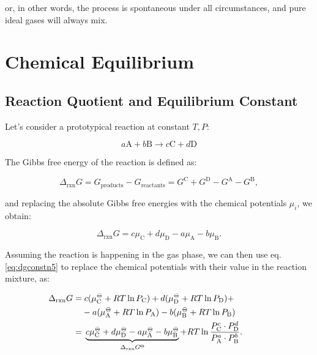 \documentclass[
]{book}
\theoremstyle{definition}
\theoremstyle{definition}
\theoremstyle{definition}
\theoremstyle{remark}
\begin{document}
or, in other words, the process is spontaneous under all circumstances, and pure ideal gases will always mix.

\renewcommand*{\standardstate}{{-\kern-6pt{\ominus}\kern-6pt-}}

\hypertarget{ChemicalEquilibrium}{%
\chapter{Chemical Equilibrium}\label{ChemicalEquilibrium}}

\hypertarget{reaction-quotient-and-equilibrium-constant}{%
\section{Reaction Quotient and Equilibrium Constant}\label{reaction-quotient-and-equilibrium-constant}}

Let's consider a prototypical reaction at constant \(T,P\):

\begin{equation}
 a\mathrm{A} + b\mathrm{B} \rightarrow c\mathrm{C} + d\mathrm{D} 
\label{eq:reaction4}
\end{equation}

The Gibbs free energy of the reaction is defined as:

\begin{equation}
\Delta_{\text{rxn}} G = G_{\text{products}} - G_{\text{reactants}} = G^{\text{C}} + G^{\text{D}} - G^{\text{A}}-G^{\text{B}},
\label{eq:chemeq1}
\end{equation}

and replacing the absolute Gibbs free energies with the chemical potentials \(\mu_i\), we obtain:

\begin{equation}
\Delta_{\text{rxn}} G = c \mu_{\text{C}} + d \mu_{\text{D}} - a \mu_{\text{A}}- b\mu_{\text{B}}.
\label{eq:chemeq2}
\end{equation}

Assuming the reaction is happening in the gas phase, we can then use eq. \eqref{eq:dgconstn5} to replace the chemical potentials with their value in the reaction mixture, as:

\begin{equation}
\begin{aligned}
\mkern-60mu \Delta_{\text{rxn}} G =& \; c (\mu_{\text{C}}^{-\kern-6pt{\ominus}\kern-6pt-}+RT \ln P_{\text{C}}) + d (\mu_{\text{D}}^{-\kern-6pt{\ominus}\kern-6pt-}+RT \ln P_{\text{D}}) +\\ & - a (\mu_{\text{A}}^{-\kern-6pt{\ominus}\kern-6pt-}+RT \ln P_{\text{A}}) - b (\mu_{\text{B}}^{-\kern-6pt{\ominus}\kern-6pt-}+RT \ln P_{\text{B}}) \\
  =& \; \underbrace{c \mu_{\text{C}}^{-\kern-6pt{\ominus}\kern-6pt-}+ d \mu_{\text{D}}^{-\kern-6pt{\ominus}\kern-6pt-}- a \mu_{\text{A}}^{-\kern-6pt{\ominus}\kern-6pt-}- b\mu_{\text{B}}^{-\kern-6pt{\ominus}\kern-6pt-}}_{\Delta_{\text{rxn}} G^{-\kern-6pt{\ominus}\kern-6pt-}}  +RT \ln \frac{P_{\text{C}}^c \cdot P_{\text{D}}^d}{P_{\text{A}}^a \cdot P_{\text{B}}^b}.
\end{aligned}
\label{eq:chemeq3}
\end{equation}
\end{document}
